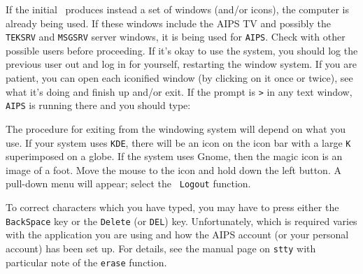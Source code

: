     If the initial \CR\ produces instead a set of windows (and/or
icons), the computer is already being used.  If these windows include
the AIPS TV and possibly the {\tt TEKSRV} and {\tt MSGSRV} server
windows, it is being used for {\tt AIPS}\@.  Check with other possible
users before proceeding.  If it's okay to use the system, you should
log the previous user out and log in for yourself, restarting the
window system.  If you are patient, you can open each iconified window
(by clicking on it once or twice), see what it's doing and finish up
and/or exit.  If the prompt is {\tt >} in any text window, {\tt AIPS}
is running there and you should type:

     The procedure for exiting from the windowing system will depend
on what  you use.  If your system uses {\tt KDE},
there will be an icon on the icon bar with a large {\tt K}
superimposed on a globe.  If the system uses Gnome, then the magic
icon is an image of a foot.  Move the mouse to the icon and hold down
the left button.  A pull-down menu will appear; select the {\tt
Logout} function.


     To correct characters which you have typed, you may have to press
either the {\tt BackSpace} key or the {\tt Delete} (or {\tt DEL}) key.
Unfortunately, which is required varies with the application you are
using and how the AIPS account (or your personal account) has been set
up.  For details, see the manual page on {\tt stty} with particular
note of the {\tt erase} function.

